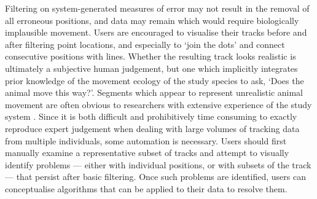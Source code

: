 \documentclass[10pt,paper=a4,headings=standardclasses
]{scrartcl}
\begin{document}
Filtering on system-generated measures of error may not result in the removal of all erroneous positions, and data may remain which would require biologically implausible movement.
Users are encouraged to visualise their tracks before and after filtering point locations, and especially to `join the dots' and connect consecutive positions with lines.
Whether the resulting track looks realistic is ultimately a subjective human judgement, but one which implicitly integrates prior knowledge of the movement ecology of the study species to ask, `Does the animal move this way?'.
Segments which appear to represent unrealistic animal movement are often obvious to researchers with extensive experience of the study system \citep[the non-movement approach; see][]{bjorneraas2010}.
Since it is both difficult and prohibitively time consuming to exactly reproduce expert judgement when dealing with large volumes of tracking data from multiple individuals, some automation is necessary.
Users should first manually examine a representative subset of tracks and attempt to visually identify problems --- either with individual positions, or with subsets of the track --- that persist after basic filtering.
Once such problems are identified, users can conceptualise algorithms that can be applied to their data to resolve them.
\end{document}
